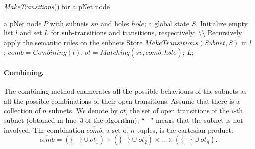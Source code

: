 \documentclass[smallcondensed]{svjour3}
\newcommand{\noteSB}[2][color=green!40, size=\tiny]{\todo[#1]{{\bf Simon: } {#2}}}
\begin{document}
\begin{algorithm}[h]
\caption{\emph{MakeTransitions}() for a pNet node}
  \label{alg2}
\begin{algorithmic}[1]
\Require a pNet node $P$ with subnets $\overline{sn}$ and holes $\overline{hole}$; a global state $S$.
\State Initialize empty list $l$ and set $L$ for sub-transitions and transitions, respectively;
        \hfill $\setminus \setminus$ Recursively apply the semantic rules on the subnets
           \State Store $\mathit{MakeTransitions}(Subnet, S)$ in $l$;
	\EndFor
	\State $\overline{comb} = \mathit{Combining}(l)$;
           \State $ot = \mathit{Matching}(sv, \overline{\mathit{comb}}, \overline{\mathit{hole}})$;
	\EndFor
\State \Return $L$;
\end{algorithmic}  
\end{algorithm}



%
%


\def\inactive{\{-\}}
\paragraph{Combining.}
The combining method enumerates all the possible behaviours of the
subnets as all the possible combinations of their open transitions.
Assume that there is a collection of $n$ subnets.
We denote by $\overline{ot}_i$ the set of open
transitions of the $i$-th
subnet (obtained in line~3 of the algorithm); %
``$-$'' means that the subnet is not involved.
The combination $\overline{comb}$, a set of $n$-tuples, is the
cartesian product:  
$$\overline{comb} = (\inactive\cup \overline{ot}_1) \times (\inactive\cup \overline{ot}_2)\times \dots \times (\inactive\cup \overline{ot}_n). $$
\end{document}

